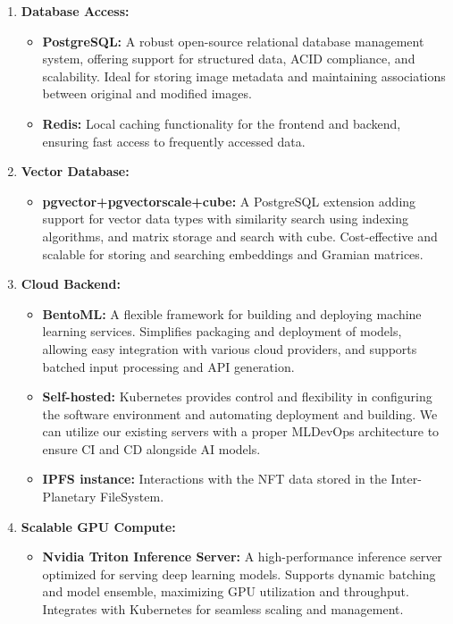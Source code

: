 \begin{enumerate}
\item \textbf{Database Access:}
    \begin{itemize}
        \item \textbf{PostgreSQL:} A robust open-source relational database management system, offering support for structured data, ACID compliance, and scalability. Ideal for storing image metadata and maintaining associations between original and modified images.
        \item \textbf{Redis:} Local caching functionality for the frontend and backend, ensuring fast access to frequently accessed data.
    \end{itemize}

\item \textbf{Vector Database:}
    \begin{itemize}
        \item \textbf{pgvector+pgvectorscale+cube:} A PostgreSQL extension adding support for vector data types with similarity search using indexing algorithms, and matrix storage and search with cube. Cost-effective and scalable for storing and searching embeddings and Gramian matrices.
    \end{itemize}

\item \textbf{Cloud Backend:}
    \begin{itemize}
        \item \textbf{BentoML:} A flexible framework for building and deploying machine learning services. Simplifies packaging and deployment of models, allowing easy integration with various cloud providers, and supports batched input processing and API generation.
        \item \textbf{Self-hosted:} Kubernetes provides control and flexibility in configuring the software environment and automating deployment and building. We can utilize our existing servers with a proper MLDevOps architecture to ensure CI and CD alongside AI models.
        \item \textbf{IPFS instance:} Interactions with the NFT data stored in the Inter-Planetary FileSystem.
    \end{itemize}

\item \textbf{Scalable GPU Compute:}
    \begin{itemize}
        \item \textbf{Nvidia Triton Inference Server:} A high-performance inference server optimized for serving deep learning models. Supports dynamic batching and model ensemble, maximizing GPU utilization and throughput. Integrates with Kubernetes for seamless scaling and management.
    \end{itemize}
\end{enumerate}
\newpage

